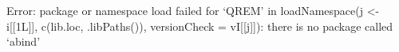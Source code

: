 Error: package or namespace load failed for ‘QREM’ in loadNamespace(j <- i[[1L]], c(lib.loc, .libPaths()), versionCheck = vI[[j]]):
 there is no package called ‘abind’
